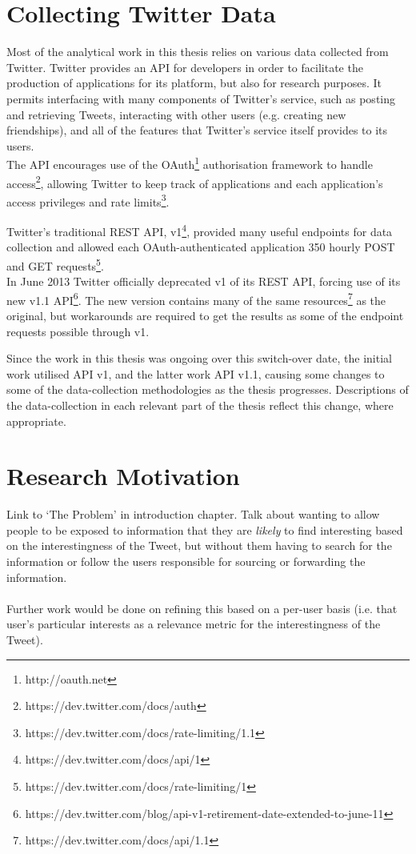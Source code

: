 \section{Collecting Twitter Data}
Most of the analytical work in this thesis relies on various data collected from Twitter. Twitter provides an API for developers in order to facilitate the production of applications for its platform, but also for research purposes. It permits interfacing with many components of Twitter's service, such as posting and retrieving Tweets, interacting with other users (e.g. creating new friendships), and all of the features that Twitter's service itself provides to its users.\\
The API encourages use of the OAuth\footnote{http://oauth.net} authorisation framework to handle access\footnote{https://dev.twitter.com/docs/auth}, allowing Twitter to keep track of applications and each application's access privileges and rate limits\footnote{https://dev.twitter.com/docs/rate-limiting/1.1}.

Twitter's traditional REST API, v1\footnote{https://dev.twitter.com/docs/api/1}, provided many useful endpoints for data collection and allowed each OAuth-authenticated application 350 hourly POST and GET requests\footnote{https://dev.twitter.com/docs/rate-limiting/1}.\\
In June 2013 Twitter officially deprecated v1 of its REST API, forcing use of its new v1.1 API\footnote{https://dev.twitter.com/blog/api-v1-retirement-date-extended-to-june-11}. The new version contains many of the same resources\footnote{https://dev.twitter.com/docs/api/1.1} as the original, but workarounds are required to get the results as some of the endpoint requests possible through v1.

Since the work in this thesis was ongoing over this switch-over date, the initial work utilised API v1, and the latter work API v1.1, causing some changes to some of the data-collection methodologies as the thesis progresses. Descriptions of the data-collection in each relevant part of the thesis reflect this change, where appropriate.


\section{Research Motivation}
Link to `The Problem' in introduction chapter. Talk about wanting to allow people to be exposed to information that they are \textit{likely} to find interesting based on the interestingness of the Tweet, but without them having to search for the information or follow the users responsible for sourcing or forwarding the information. \\ \\
Further work would be done on refining this based on a per-user basis (i.e. that user's particular interests as a relevance metric for the interestingness of the Tweet).
